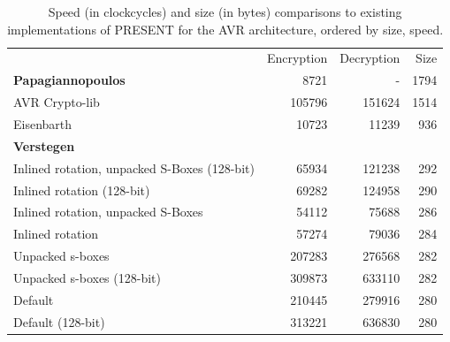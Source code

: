 \documentclass[11pt]{llncs2e} %
\begin{document}

\begin{table}[h]
\centering
\footnotesize
	\begin{tabular}{ l r r r }
		& Encryption & Decryption & Size \\
	\textbf{Papagiannopoulos } & 8721 & - & 1794 \\
	AVR Crypto-lib~\cite{avr_crypto_lib} & 105796 & 151624 & 1514 \\
	Eisenbarth~\cite{eisenbarth2012compact} & 10723 & 11239 & 936 \\
	\textbf{Verstegen} & & & \\
	\hspace{1em} Inlined rotation, unpacked S-Boxes (128-bit) & 65934 & 121238 & 292 \\
	\hspace{1em} Inlined rotation (128-bit) & 69282	& 124958 & 290 \\
	\hspace{1em} Inlined rotation, unpacked S-Boxes & 54112 & 75688 & 286 \\
	\hspace{1em} Inlined rotation & 57274 & 79036 & 284 \\
	\hspace{1em} Unpacked s-boxes & 207283 & 276568 & 282 \\
	\hspace{1em} Unpacked s-boxes (128-bit) & 309873 & 633110 & 282 \\
	\hspace{1em} Default & 210445 & 279916 & 280 \\
	\hspace{1em} Default (128-bit) & 313221 & 636830 & 280 \\
	\end{tabular}
	\caption{\footnotesize Speed (in clockcycles) and size (in bytes) comparisons to existing implementations of PRESENT for the AVR architecture, ordered by size, speed.}
	\label{numbers}
\end{table}

{}

\end{document}
